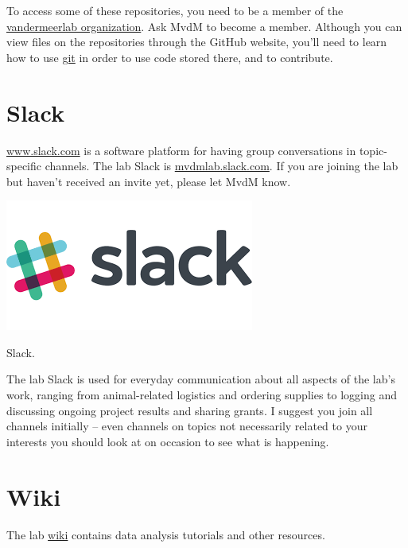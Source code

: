 \documentclass{tufte-book}
\begin{document}
To access some of these repositories, you need to be a member of the
\href{www.github.com/vandermeerlab}{vandermeerlab organization}. Ask
MvdM to become a member. Although you can view files on the
repositories through the GitHub website, you'll need to learn how to
use \href{https://www.codecademy.com/learn/learn-git}{git} in order to
use code stored there, and to contribute.

\section{Slack}

\href{Slack}{www.slack.com} is a software platform for having group
conversations in topic-specific channels. The lab Slack is
\url{mvdmlab.slack.com}. If you are joining the lab but haven't
received an invite yet, please let MvdM know.

\begin{marginfigure}%
  \includegraphics[width=\linewidth]{images/slack.png}
  \caption{Slack.}
  \label{fig:slack}
\end{marginfigure}

The lab Slack is used for everyday communication about all aspects of
the lab's work, ranging from animal-related logistics and ordering
supplies to logging and discussing ongoing project results and sharing
grants. I suggest you join all channels initially -- even channels on
topics not necessarily related to your interests you should look at on
occasion to see what is happening.

\section{Wiki}

The lab \href{http://discovery.dartmouth.edu/~mvdm/wiki/}{wiki}
contains data analysis tutorials and other resources.
\end{document}
